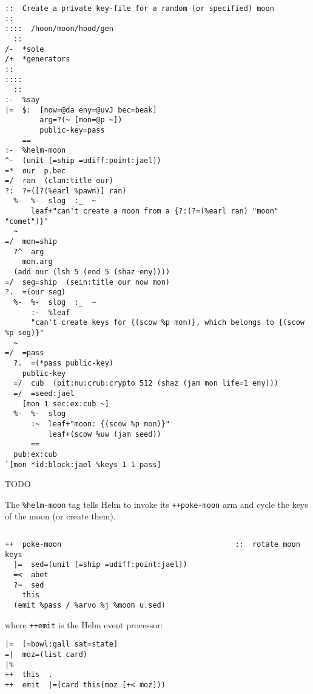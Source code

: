 \begin{lstlisting}[caption={\texttt{gen/hood/moon.hoon}, 🄯Tlon}]
::  Create a private key-file for a random (or specified) moon
::
::::  /hoon/moon/hood/gen
  ::
/-  *sole
/+  *generators
::
::::
  ::
:-  %say
|=  $:  [now=@da eny=@uvJ bec=beak]
        arg=?(~ [mon=@p ~])
        public-key=pass
    ==
:-  %helm-moon
^-  (unit [=ship =udiff:point:jael])
=*  our  p.bec
=/  ran  (clan:title our)
?:  ?=([?(%earl %pawn)] ran)
  %-  %-  slog  :_  ~
      leaf+"can't create a moon from a {?:(?=(%earl ran) "moon" "comet")}"
  ~
=/  mon=ship
  ?^  arg
    mon.arg
  (add our (lsh 5 (end 5 (shaz eny))))
=/  seg=ship  (sein:title our now mon)
?.  =(our seg)
  %-  %-  slog  :_  ~
      :-  %leaf
      "can't create keys for {(scow %p mon)}, which belongs to {(scow %p seg)}"
  ~
=/  =pass
  ?.  =(*pass public-key)
    public-key
  =/  cub  (pit:nu:crub:crypto 512 (shaz (jam mon life=1 eny)))
  =/  =seed:jael
    [mon 1 sec:ex:cub ~]
  %-  %-  slog
      :~  leaf+"moon: {(scow %p mon)}"
          leaf+(scow %uw (jam seed))
      ==
  pub:ex:cub
`[mon *id:block:jael %keys 1 1 pass]
\end{lstlisting}

TODO

The \texttt{\%helm-moon} tag tells Helm to invoke its \texttt{++poke-moon} arm and cycle the keys of the moon (or create them).

\begin{lstlisting}[style=nonumbers,
                   caption={\texttt{lib/hood/helm.hoon}, line 211}]
%helm-moon             =;(f (f !<(_+<.f vase)) poke-moon)
\end{lstlisting}

\begin{lstlisting}[style=nonumbers,
                   caption={\texttt{lib/hood/helm.hoon}, lines 75–80}]
++  poke-moon                                        ::  rotate moon keys
  |=  sed=(unit [=ship =udiff:point:jael])
  =<  abet
  ?~  sed
    this
  (emit %pass / %arvo %j %moon u.sed)
\end{lstlisting}

where \texttt{++emit} is the Helm event processor:

\begin{lstlisting}[style=nonumbers,
                   caption={\texttt{lib/hood/helm.hoon}, line 21–24, 29}]
|=  [=bowl:gall sat=state]
=|  moz=(list card)
|%
++  this  .
++  emit  |=(card this(moz [+< moz]))
\end{lstlisting}

